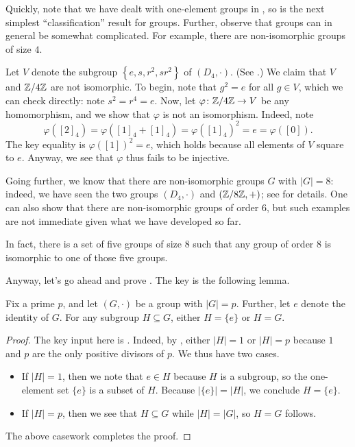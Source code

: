 \documentclass[../notes.tex]{subfiles}
\begin{document}
Quickly, note that we have dealt with one-element groups in , so  is the next simplest ``classification'' result for groups. Further, observe that groups can in general be somewhat complicated. For example, there are non-isomorphic groups of size $4$.
\begin{example}
    Let $V$ denote the subgroup $\left\{e,s,r^2,sr^2\right\}$ of $(D_4,\cdot)$. (See .) We claim that $V$ and $\mathbb Z/4\mathbb Z$ are not isomorphic. To begin, note that $g^2=e$ for all $g\in V$, which we can check directly: note $s^2=r^4=e$. Now, let $\varphi\colon\mathbb Z/4\mathbb Z\to V$ be any homomorphism, and we show that $\varphi$ is not an isomorphism. Indeed, note
    \[\varphi([2]_4)=\varphi([1]_4+[1]_4)=\varphi([1]_4)^2=e=\varphi([0]).\]
    The key equality is $\varphi([1])^2=e$, which holds because all elements of $V$ square to $e$. Anyway, we see that $\varphi$ thus fails to be injective.
\end{example}
Going further, we know that there are non-isomorphic groups $G$ with $|G|=8$: indeed, we have seen the two groups $(D_4,\cdot)$ and $(\mathbb Z/8\mathbb Z,+)$; see  for details. One can also show that there are non-isomorphic groups of order $6$, but such examples are not immediate given what we have developed so far.
\begin{remark}
    In fact, there is a set of five groups of size $8$ such that any group of order $8$ is isomorphic to one of those five groups.
\end{remark}
Anyway, let's go ahead and prove . The key is the following lemma.
\begin{lemma} \label{lem:subgroups-of-prime-order-group}
    Fix a prime $p$, and let $(G,\cdot)$ be a group with $\left|G\right|=p$. Further, let $e$ denote the identity of $G$. For any subgroup $H\subseteq G$, either $H=\{e\}$ or $H=G$.
\end{lemma}
\begin{proof}
    The key input here is . Indeed, by , either $\left|H\right|=1$ or $\left|H\right|=p$ because $1$ and $p$ are the only positive divisors of $p$. We thus have two cases.
    \begin{itemize}
        \item If $\left|H\right|=1$, then we note that $e\in H$ because $H$ is a subgroup, so the one-element set $\{e\}$ is a subset of $H$. Because $\left|\{e\}\right|=\left|H\right|$, we conclude $H=\{e\}$.
        \item If $\left|H\right|=p$, then we see that $H\subseteq G$ while $\left|H\right|=\left|G\right|$, so $H=G$ follows.
    \end{itemize}
    The above casework completes the proof.
\end{proof}
\end{document}

